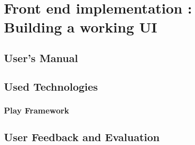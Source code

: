 \chapter{Front end implementation : Building a working UI}

\section{User's Manual}

\section{Used Technologies}

\subsection{Play Framework}

\section{User Feedback and Evaluation}
\pagebreak
%
%